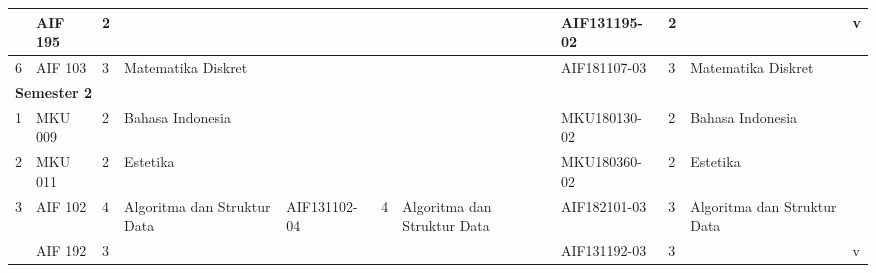 \begin{landscape}
\begin{table}[H]
\begin{tabular}{|p{0.35cm}|p{1.75cm}|p{0.65cm}|p{3.55cm}|p{2.1cm}|p{0.65cm}|p{3.55cm}|p{2.1cm}|p{0.65cm}|p{3.55cm}|p{1.75cm}|}
 & AIF 195 & 2 &  &  &  &  & AIF131195-02 & 2 &  & v \\ \hline
6 & AIF 103 & 3 & Matematika Diskret &  &  &  & AIF181107-03 & 3 & Matematika Diskret &  \\ \hline
\multicolumn{11}{|l|}{\textbf{Semester 2}} \\ \hline
1 & MKU 009 & 2 & Bahasa Indonesia &  &  &  & MKU180130-02 & 2 & Bahasa Indonesia &  \\ \hline
2 & MKU 011 & 2 & Estetika &  &  &  & MKU180360-02 & 2 & Estetika &  \\ \hline
\multirow{2}{*}{3} & AIF 102 & 4 & \multirow{2}{3.55cm}{Algoritma dan Struktur Data} & AIF131102-04 & 4 & Algoritma dan Struktur Data & AIF182101-03 & 3 & \multirow{2}{3.55cm}{Algoritma dan Struktur Data} &  \\ \cline{2-3} \cline{5-9} \cline{11-11} 
 & AIF 192 & 3 &  &  &  &  & AIF131192-03 & 3 &  & v \\ \hline
\end{tabular}
\end{table}


\end{landscape}

